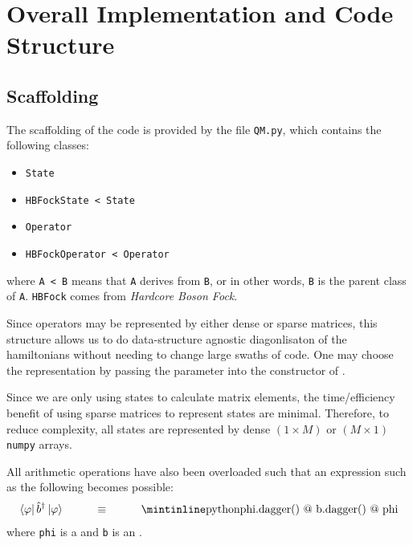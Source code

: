 \clearpage
\section{Overall Implementation and Code Structure}
    \subsection{Scaffolding}
        The scaffolding of the code is provided by the file \texttt{QM.py}, which contains the following classes:
        \vspace{-0.5\baselineskip}
        \begin{multicols}{2}
            \begin{itemize}
                \item \texttt{State}
                \item \texttt{HBFockState < State}
                \item \texttt{Operator}
                \item \texttt{HBFockOperator < Operator}
            \end{itemize}
        \end{multicols}
        \vspace{-\baselineskip}
        where \texttt{A < B} means that \texttt{A} derives from \texttt{B}, or in other words, \texttt{B} is the parent class of \texttt{A}. \texttt{HBFock} comes from \textit{Hardcore Boson Fock}.
        
        Since operators may be represented by either dense or sparse matrices, this structure allows us to do data-structure agnostic diagonlisaton of the hamiltonians without needing to change large swaths of code. One may choose the representation by passing the parameter  into the constructor of . 
        
        Since we are only using states to calculate matrix elements, the time/efficiency benefit of using sparse matrices to represent states are minimal. Therefore, to reduce complexity, all states are represented by dense $(1 \times M)$ or $(M \times 1)$ \texttt{numpy} arrays. 

        All arithmetic operations have also been overloaded such that an expression such as the following becomes possible:
        \begin{align}
            \bra{\varphi} \hat{b}^\dagger \ket{\varphi} \hspace{1cm}\equiv\hspace{1cm} 
            \text{\inpycode{phi.dagger() @ b.dagger() @ phi}}
        \end{align}
        where \texttt{phi} is a  and \texttt{b} is an .
        
